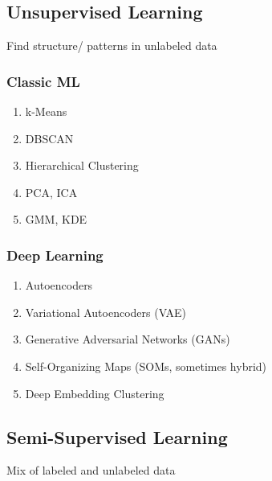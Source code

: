 \subsection*{Unsupervised Learning}

Find structure/ patterns in unlabeled data

\begin{table}[H]
\begin{minipage}{0.45\linewidth}
\subsubsection*{Classic ML}
\begin{enumerate}
    \item k-Means
    \item DBSCAN
    \item Hierarchical Clustering
    \item PCA, ICA
    \item GMM, KDE
\end{enumerate}
\end{minipage}
\begin{minipage}{0.45\linewidth}
\subsubsection*{Deep Learning}
\begin{enumerate}
    \item Autoencoders
    \item Variational Autoencoders (VAE)
    \item Generative Adversarial Networks (GANs)
    \item Self-Organizing Maps (SOMs, sometimes hybrid)
    \item Deep Embedding Clustering
\end{enumerate}
\end{minipage}
\end{table}





\subsection*{Semi-Supervised Learning}

Mix of labeled and unlabeled data

